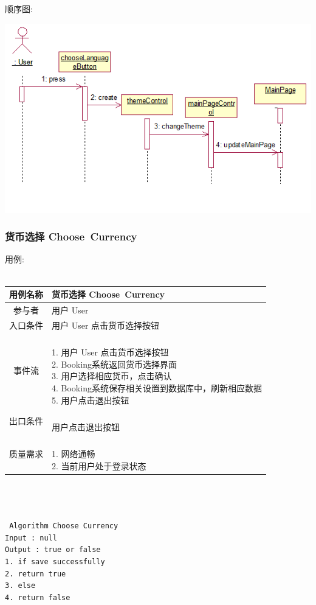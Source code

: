 \documentclass[11pt]{article}
\begin{document}
			顺序图: 
			\begin{center}
			\includegraphics[scale=0.42]{选择主题顺序图.png}
			\end{center}


		\subsubsection{货币选择 Choose\ Currency}
			用例: \\ \\
			\begin{tabular}{c|l}
			\hline
			用例名称 & 货币选择 Choose\ Currency \\ \hline
			参与者 & 用户 User  \\ \hline
			入口条件 & 用户 User 点击货币选择按钮 \\ \hline
			事件流 & 	\parbox{33em}{\ \\
						1. 用户 User  点击货币选择按钮 \\
						2. Booking系统返回货币选择界面 \\
						3. 用户选择相应货币，点击确认  \\
						4. Booking系统保存相关设置到数据库中，刷新相应数据 \\
						5. 用户点击退出按钮 \\
						} \\ \hline
			出口条件 & \parbox{33em}{\ \\
						用户点击退出按钮 \\
						} \\ \hline
			质量需求 & \parbox{33em}{\ \\
						1. 网络通畅 \\
						2. 当前用户处于登录状态 \\
						} \\ \hline
			\end{tabular} \\ \\ \\
			\texttt{
			Algorithm Choose Currency \\
			Input : null \\
			Output : true or false \\
			1. if save successfully \\
			2.     return true \\
			3. else \\
			4.     return false \\
			} \\
			
\end{document}
